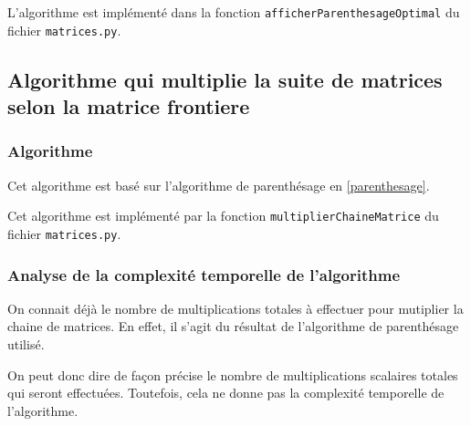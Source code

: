 \documentclass[10.9pt]{article} %
\begin{document}
L'algorithme est implémenté dans la fonction \texttt{afficherParenthesageOptimal} du
fichier \texttt{matrices.py}.

\subsection{Algorithme qui multiplie la suite de matrices selon la matrice frontiere}

\subsubsection{Algorithme}

Cet algorithme est basé sur l'algorithme de parenthésage en \ref{parenthesage}.

\begin{algorithm}
\end{algorithm}

Cet algorithme est implémenté par la fonction \texttt{multiplierChaineMatrice} du fichier \texttt{matrices.py}.

\subsubsection{Analyse de la complexité temporelle de l'algorithme}

On connait déjà le nombre de multiplications totales à effectuer pour mutiplier la chaine de matrices. En effet,
il s'agit du résultat de l'algorithme de parenthésage utilisé.

On peut donc dire de façon précise le nombre de multiplications scalaires totales qui seront effectuées. 
Toutefois, cela ne donne pas la complexité temporelle de l'algorithme.
\end{document}

